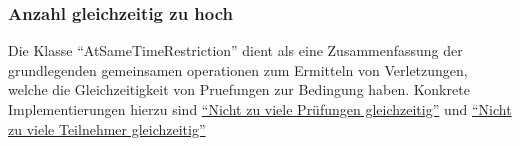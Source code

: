 \subsubsection{Anzahl gleichzeitig zu hoch}\label{subsubsec:anzahl-gleichzeitig-zu-hoch}
Die Klasse \enquote{AtSameTimeRestriction} dient als eine Zusammenfassung der grundlegenden
gemeinsamen operationen zum Ermitteln von Verletzungen, welche die Gleichzeitigkeit von Pruefungen
zur Bedingung haben.
Konkrete Implementierungen hierzu sind
\hyperref[subsubsec:nicht-zu-viele-pruefungen-gleichzeitig]{\enquote{Nicht zu viele Prüfungen gleichzeitig}}
und
\hyperref[subsubsec:nicht-zu-viele-teilnehmer-gleichzeitig]{\enquote{Nicht zu viele Teilnehmer gleichzeitig}}
